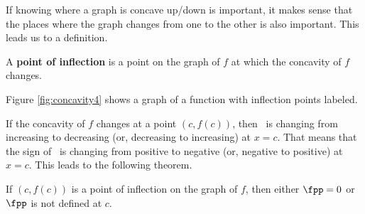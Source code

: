 %
%
%



If knowing where a graph is concave up/down is important, it makes sense that the places where the graph changes from one to the other is also important. This leads us to a definition.

{A \textbf{point of inflection} is a point on the graph of $f$ at which the concavity of $f$ changes.
}

Figure \ref{fig:concavity4} shows a graph of a function with inflection points labeled.


If the concavity of $f$ changes at a point $(c,f(c))$, then \fp\ is changing from increasing to decreasing (or, decreasing to increasing) at $x=c$. That means that the sign of \fpp\ is changing from positive to negative (or, negative to positive) at $x=c$.  This leads to the following theorem.

{If $(c,f(c))$ is a point of inflection on the graph of $f$, then either $\fpp=0$ or $\fpp$ is not defined at $c$.}

